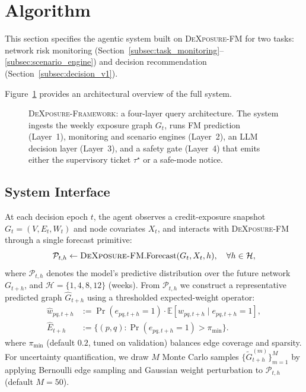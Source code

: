 \section{Algorithm}
\label{sec:algorithm}

This section specifies the agentic system built on \textsc{DeXposure-FM} for two tasks: network risk monitoring (Section~\ref{subsec:task_monitoring}--\ref{subsec:scenario_engine}) and decision recommendation (Section~\ref{subsec:decision_v1}).

Figure~\ref{fig:system_overview} provides an architectural overview of the full system.

\begin{figure}[!t]
    \centering
    \resizebox{0.95\textwidth}{!}{}
    \caption{\textsc{DeXposure-Framework}: a four-layer query architecture. The system ingests the weekly exposure graph $G_t$, runs FM prediction (Layer~1), monitoring and scenario engines (Layer~2), an LLM decision layer (Layer~3), and a safety gate (Layer~4) that emits either the supervisory ticket $\tau^\star$ or a safe-mode notice.}
    \label{fig:system_overview}
\end{figure}

\subsection{System Interface}
\label{subsec:system_interface}
At each decision epoch $t$, the agent observes a credit-exposure snapshot $G_t=(V,E_t,W_t)$ and node covariates $X_t$, and interacts with \textsc{DeXposure-FM} through a single forecast primitive:
\begin{equation}
\label{eq:agent_forecast_primitive}
\mathcal{P}_{t,h} \leftarrow \textsc{DeXposure-FM}.\mathrm{Forecast}(G_t,X_t,h), \quad \forall h\in\mathcal{H},
\end{equation}
where $\mathcal{P}_{t,h}$ denotes the model's predictive distribution over the future network $G_{t+h}$, and $\mathcal{H}=\{1,4,8,12\}$ (weeks). From $\mathcal{P}_{t,h}$ we construct a representative predicted graph $\widehat{G}_{t+h}$ using a thresholded expected-weight operator:
\begin{align}
\label{eq:expected_graph}
\widehat{w}_{pq,t+h}
&:=
\Pr(e_{pq,t+h}=1)\cdot \mathbb{E}[w_{pq,t+h}\mid e_{pq,t+h}=1],
\\
\widehat{E}_{t+h}
&:=\{(p,q): \Pr(e_{pq,t+h}=1)>\pi_{\min}\}.
\end{align}
where $\pi_{\min}$ (default $0.2$, tuned on validation) balances edge coverage and sparsity. For uncertainty quantification, we draw $M$ Monte Carlo samples $\{\widetilde{G}^{(m)}_{t+h}\}_{m=1}^M$ by applying Bernoulli edge sampling and Gaussian weight perturbation to $\mathcal{P}_{t,h}$ (default $M=50$).

